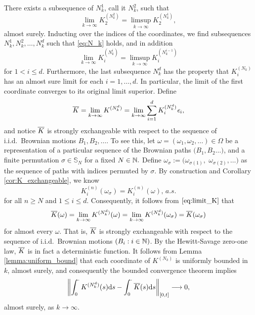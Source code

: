 There exists a subsequence of $N_k^1$, call it $N_k^2$, such that
\[
\lim_{k \to \infty} K_2^{(N_k^2)} = \limsup_{k \to \infty} K_2^{(N_k^1)},
\]
almost surely.
Inducting over the indices of the coordinates, we find subsequences
$N_k^1, N_k^2, \dots, N_k^d$ such that \eqref{eq:N_k} holds, and in addition
\[
\lim_{k \to \infty} K_i^{(N_k^i)} = \limsup_{k \to \infty} K_i^{(N_k^{i -1})}
\]
for $1 < i \leq d.$ Furthermore, the last subsequence $N_k^d$ has the property that $K_i^{(N_k)}$ has an almost sure limit for each $i = 1, \dots, d.$ In particular, the limit of the first coordinate converges to its original limit superior. 
Define
\begin{align}\label{eq:limit_K}
\overline{K} = \lim_{k \to \infty}K^{(N_k^d)} = \lim_{k \to \infty}\sum_{i = 1}^dK_i^{(N_k^d)}\mathit{e}_i,
\end{align}
and notice $\overline{K}$ is strongly exchangeable with respect to the sequence of i.i.d.\ Brownian motions $B_1,B _2, \dots$. To see this, let $\omega = (\omega_1, \omega_2, \dots) \in \Omega$ be a representation of a particular sequence of the Brownian paths $\big(B_1, B_2 \dots\big)$, and a finite permutation $\sigma \in \mathbb{S}_N$ for a fixed $N \in \mathbb{N}.$ Define $\omega_\sigma := (\omega_{\sigma(1)},$ $\omega_{\sigma(2)}, \dots)$ as the sequence of paths with indices permuted by $\sigma.$ By construction and Corollary \eqref{cor:K_exchangeable}, we know
 \[
 K_i^{(n)}(\omega_\sigma) =  K_i^{(n)}(\omega), \, a.s.
 \]
 for all $n \geq N$ and $1\leq i \leq d$. Consequently, it follows from $\eqref{eq:limit_K}$ that 
 \[
 \overline{K}(\omega) = \lim_{k \to \infty} K^{(N_k^d)}(\omega) = \lim_{k \to \infty} K^{(N_k^d)}(\omega_\sigma) = \overline{K}(\omega_\sigma)
 \] for almost every $\omega$. That is, $\overline{K}$ is strongly exchangeable with respect to the sequence of i.i.d.\ Brownian motions $(B_i : i \in \mathbb{N})$. 
By the Hewitt-Savage zero-one law, $\overline{K}$ is in fact a deterministic function. It follows from Lemma \ref{lemma:uniform_bound} that each coordinate of $K^{(N_k)}$ is uniformly bounded in $k$, almost surely, and consequently the bounded convergence theorem implies
\[
\left\|\int_0^\cdot K^{(N_k^d)}(s) \mathrm{d} s - \int_0^\cdot\overline{K}(s) \mathrm{d} s\right\|_{[0, t]} \longrightarrow 0,
\]
almost surely, as $k \to \infty.$ 

